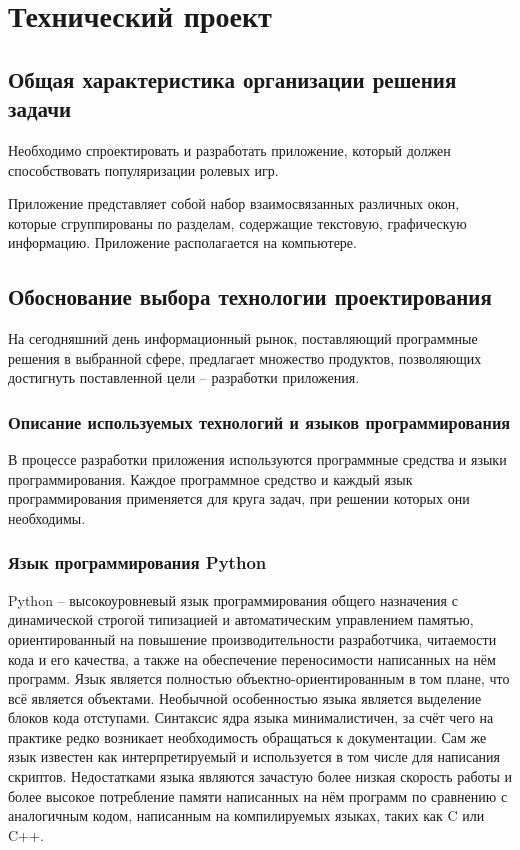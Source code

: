 \section{Технический проект}
\subsection{Общая характеристика организации решения задачи}

Необходимо спроектировать и разработать приложение, который должен способствовать популяризации ролевых игр.

Приложение представляет собой набор взаимосвязанных различных окон, которые сгруппированы по разделам, содержащие текстовую, графическую информацию. Приложение располагается на компьютере.

\subsection{Обоснование выбора технологии проектирования}

На сегодняшний день информационный рынок, поставляющий программные решения в выбранной сфере, предлагает множество продуктов, позволяющих достигнуть поставленной цели – разработки приложения.

\subsubsection{Описание используемых технологий и языков программирования}

В процессе разработки приложения используются программные средства и языки программирования. Каждое программное средство и каждый язык программирования применяется для круга задач, при решении которых они необходимы.

\subsubsection{Язык программирования Python}

Python –  высокоуровневый язык программирования общего назначения с динамической строгой типизацией и автоматическим управлением памятью, ориентированный на повышение производительности разработчика, читаемости кода и его качества, а также на обеспечение переносимости написанных на нём программ. Язык является полностью объектно-ориентированным в том плане, что всё является объектами. Необычной особенностью языка является выделение блоков кода отступами. Синтаксис ядра языка минималистичен, за счёт чего на практике редко возникает необходимость обращаться к документации. Сам же язык известен как интерпретируемый и используется в том числе для написания скриптов. Недостатками языка являются зачастую более низкая скорость работы и более высокое потребление памяти написанных на нём программ по сравнению с аналогичным кодом, написанным на компилируемых языках, таких как C или C++.

